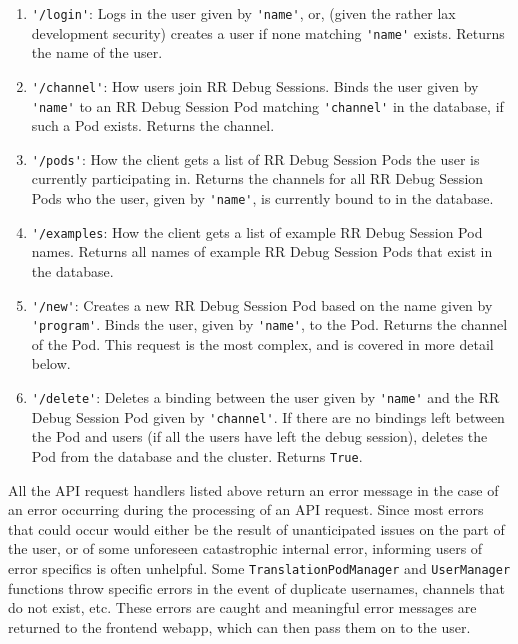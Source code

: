 \documentclass[12pt]{article}
\begin{document}
\begin{enumerate}
\item \lstinline{'/login'}: Logs in the user given by
  \lstinline{'name'}, or, (given the rather lax development security)
  creates a user if none matching \lstinline{'name'} exists.  Returns
  the name of the user.
\item \lstinline{'/channel'}: How users join RR Debug Sessions.  Binds
  the user given by \lstinline{'name'} to an RR Debug Session Pod
  matching \lstinline{'channel'} in the database, if such a Pod
  exists.  Returns the channel.
\item \lstinline{'/pods'}: How the client gets a list of RR Debug
  Session Pods the user is currently participating in.  Returns the
  channels for all RR Debug Session Pods who the user, given by
  \lstinline{'name'}, is currently bound to in the database.
\item \lstinline{'/examples}: How the client gets a list of example RR
  Debug Session Pod names.  Returns all names of example RR Debug
  Session Pods that exist in the database.
\item \lstinline{'/new'}: Creates a new RR Debug Session Pod based on
  the name given by \lstinline{'program'}.  Binds the user, given by
  \lstinline{'name'}, to the Pod.  Returns the channel of the Pod.
  This request is the most complex, and is covered in more detail
  below.
\item \lstinline{'/delete'}: Deletes a binding between the user given
  by \lstinline{'name'} and the RR Debug Session Pod given by
  \lstinline{'channel'}.  If there are no bindings left between the
  Pod and users (if all the users have left the debug session),
  deletes the Pod from the database and the cluster.  Returns
  \lstinline{True}.
\end{enumerate}

All the API request handlers listed above return an error message in
the case of an error occurring during the processing of an API
request.  Since most errors that could occur would either be the
result of unanticipated issues on the part of the user, or of some
unforeseen catastrophic internal error, informing users of error
specifics is often unhelpful.  Some \lstinline{TranslationPodManager}
and \lstinline{UserManager} functions throw specific errors in the
event of duplicate usernames, channels that do not exist, etc.  These
errors are caught and meaningful error messages are returned to the
frontend webapp, which can then pass them on to the user.
\par
\end{document}
